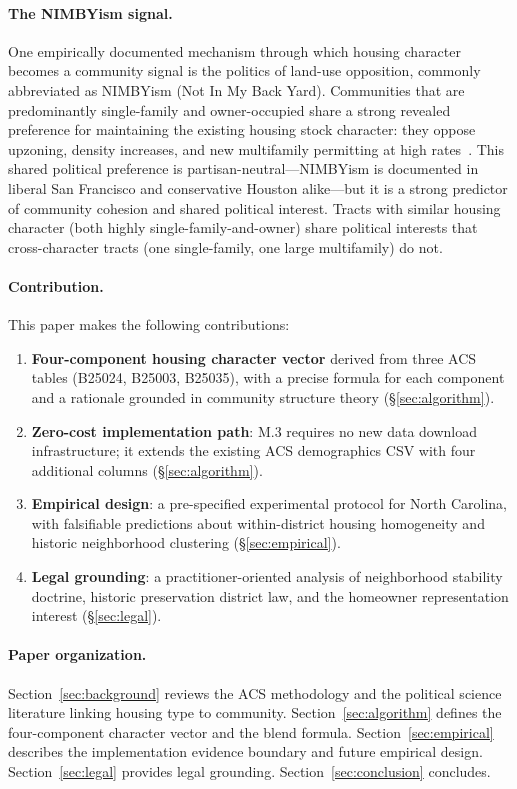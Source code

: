 \paragraph{The NIMBYism signal.}
One empirically documented mechanism through which housing character becomes
a community signal is the politics of land-use opposition, commonly abbreviated
as NIMBYism (Not In My Back Yard).
Communities that are predominantly single-family and owner-occupied share
a strong revealed preference for maintaining the existing housing stock character:
they oppose upzoning, density increases, and new multifamily permitting at high
rates~\citep{fischel2001,einstein2019}.
This shared political preference is partisan-neutral---NIMBYism is documented
in liberal San Francisco and conservative Houston alike---but it is a strong
predictor of community cohesion and shared political interest.
Tracts with similar housing character (both highly single-family-and-owner)
share political interests that cross-character tracts (one single-family,
one large multifamily) do not.

\paragraph{Contribution.}
This paper makes the following contributions:
\begin{enumerate}
  \item \textbf{Four-component housing character vector} derived from three
    ACS tables (B25024, B25003, B25035), with a precise formula for each
    component and a rationale grounded in community structure theory
    (\S\ref{sec:algorithm}).
  \item \textbf{Zero-cost implementation path}: M.3 requires no new data
    download infrastructure; it extends the existing ACS demographics CSV
    with four additional columns (\S\ref{sec:algorithm}).
  \item \textbf{Empirical design}: a pre-specified experimental protocol for
    North Carolina, with falsifiable predictions about within-district housing
    homogeneity and historic neighborhood clustering (\S\ref{sec:empirical}).
  \item \textbf{Legal grounding}: a practitioner-oriented analysis of
    neighborhood stability doctrine, historic preservation district law,
    and the homeowner representation interest (\S\ref{sec:legal}).
\end{enumerate}

\paragraph{Paper organization.}
Section~\ref{sec:background} reviews the ACS methodology and the political
science literature linking housing type to community.
Section~\ref{sec:algorithm} defines the four-component character vector and
the blend formula.
Section~\ref{sec:empirical} describes the implementation evidence boundary and
future empirical design.
Section~\ref{sec:legal} provides legal grounding.
Section~\ref{sec:conclusion} concludes.
